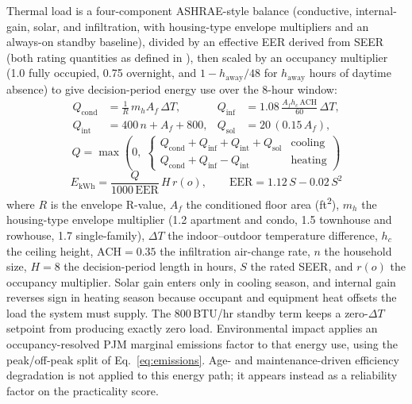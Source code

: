 \documentclass[final,3p,times]{elsarticle}
\begin{document}
Thermal load is a four-component ASHRAE-style balance \cite{accamanualj} (conductive, internal-gain, solar, and infiltration, with housing-type envelope multipliers and an always-on standby baseline), divided by an effective EER derived from SEER (both rating quantities as defined in \cite{ahri2008}), then scaled by an occupancy multiplier (1.0 fully occupied, 0.75 overnight, and $1 - h_{\mathrm{away}}/48$ for $h_{\mathrm{away}}$ hours of daytime absence) to give decision-period energy use over the 8-hour window:
\begin{equation}
\begin{aligned}
  Q_{\mathrm{cond}} &= \tfrac{1}{R}\,m_h A_f\,\Delta T, &
  Q_{\mathrm{inf}}  &= 1.08\,\tfrac{A_f h_c\,\mathrm{ACH}}{60}\,\Delta T, \\[2pt]
  Q_{\mathrm{int}}  &= 400\,n + A_f + 800, &
  Q_{\mathrm{sol}}  &= 20\,(0.15\,A_f),
\end{aligned}
  \label{eq:hvac_load}
\end{equation}
\begin{equation}
  Q = \max\!\left(0,\;
  \begin{cases}
    Q_{\mathrm{cond}} + Q_{\mathrm{inf}} + Q_{\mathrm{int}} + Q_{\mathrm{sol}} & \text{cooling} \\[3pt]
    Q_{\mathrm{cond}} + Q_{\mathrm{inf}} - Q_{\mathrm{int}}                    & \text{heating}
  \end{cases}\right)
  \label{eq:hvac_load_total}
\end{equation}
\begin{equation}
  E_{\mathrm{kWh}} = \frac{Q}{1000\,\mathrm{EER}}\,H\,r(o),
  \qquad
  \mathrm{EER} = 1.12\,S - 0.02\,S^{2}
  \label{eq:hvac_energy}
\end{equation}
\noindent where $R$ is the envelope R-value, $A_f$ the conditioned floor area (ft\textsuperscript{2}), $m_h$ the housing-type envelope multiplier (1.2 apartment and condo, 1.5 townhouse and rowhouse, 1.7 single-family), $\Delta T$ the indoor--outdoor temperature difference, $h_c$ the ceiling height, $\mathrm{ACH}=0.35$ the infiltration air-change rate, $n$ the household size, $H=8$ the decision-period length in hours, $S$ the rated SEER, and $r(o)$ the occupancy multiplier. Solar gain enters only in cooling season, and internal gain reverses sign in heating season because occupant and equipment heat offsets the load the system must supply. The 800\,BTU/hr standby term keeps a zero-$\Delta T$ setpoint from producing exactly zero load. Environmental impact applies an occupancy-resolved PJM marginal emissions factor to that energy use, using the peak/off-peak split of Eq.~\ref{eq:emissions}. Age- and maintenance-driven efficiency degradation is not applied to this energy path; it appears instead as a reliability factor on the practicality score.
\end{document}
